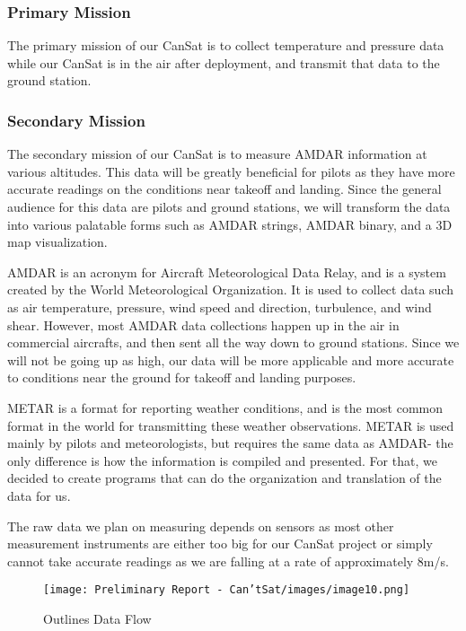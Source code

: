 \documentclass[10pt,twocolumn]{article}
\begin{document}
\subsubsection{\textbf{Primary Mission}}

The primary mission of our CanSat is to collect temperature and pressure data while our CanSat is in the air after deployment, and transmit that data to the ground station.

\subsubsection{\textbf{Secondary Mission}}

The secondary mission of our CanSat is to measure AMDAR information at various altitudes. This data will be greatly beneficial for pilots as they have more accurate readings on the conditions near takeoff and landing. Since the general audience for this data are pilots and ground stations, we will transform the data into various palatable forms such as AMDAR strings, AMDAR binary, and a 3D map visualization.

AMDAR is an acronym for Aircraft Meteorological Data Relay, and is a system created by the World Meteorological Organization. It is used to collect data such as air temperature, pressure, wind speed and direction, turbulence, and wind shear. However, most AMDAR data collections happen up in the air in commercial aircrafts, and then sent all the way down to ground stations. Since we will not be going up as high, our data will be more applicable and more accurate to conditions near the ground for takeoff and landing purposes.

METAR is a format for reporting weather conditions, and is the most common format in the world for transmitting these weather observations. METAR is used mainly by pilots and meteorologists, but requires the same data as AMDAR- the only difference is how the information is compiled and presented. For that, we decided to create programs that can do the organization and translation of the data for us.

The raw data we plan on measuring depends on sensors as most other measurement instruments are either too big for our CanSat project or simply cannot take accurate readings as we are falling at a rate of approximately 8m/s.

\begin{figure}[H]
\centering
\texttt{[image: Preliminary Report - Can'tSat/images/image10.png]}  
\caption{\label{fig:DataFlowDiagram} Outlines Data Flow}
\end{figure}
\end{document}
